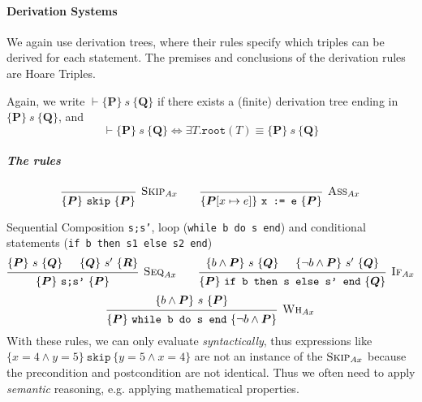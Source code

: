 \paragraph{Derivation Systems}
We again use derivation trees, where their rules specify which triples can be derived for each statement.
The premises and conclusions of the derivation rules are Hoare Triples.

Again, we write $\vdash \{ \bm{P} \} \ s \ \{ \bm{Q} \}$ if there exists a (finite) derivation tree ending in $\{ \bm{P} \} \ s \ \{ \bm{Q} \}$, and
\[
    \vdash \{ \bm{P} \} \ s \ \{ \bm{Q} \} \Leftrightarrow \exists T. \texttt{root}(T) \equiv \{ \bm{P} \} \ s \ \{ \bm{Q} \}
\]


\subparagraph{The rules}
\[
    \begin{prooftree}
        \infer0[$\textsc{Skip}_{Ax}$]{\{ \bm{P} \} \ \texttt{skip} \ \{ \bm{P} \}}
    \end{prooftree}
    \qquad
    \begin{prooftree}
        \infer0[$\textsc{Ass}_{Ax}$]{\{ \bm{P}[x \mapsto e] \} \ \texttt{x := e} \ \{ \bm{P} \}}
    \end{prooftree}
\]

Sequential Composition \texttt{s;s'}, loop (\texttt{while b do s end}) and conditional statements (\texttt{if b then s1 else s2 end})
\[
    \begin{prooftree}
        \hypo{\{ \bm{P} \} \ s \ \{ \bm{Q} \}}
        \hypo{\{ \bm{Q} \} \ s' \ \{ \bm{R} \}}
        \infer2[$\textsc{Seq}_{Ax}$]{\{ \bm{P} \} \ \texttt{s;s'} \ \{ \bm{P} \}}
    \end{prooftree}
    \qquad
    \begin{prooftree}
        \hypo{\{ b \land \bm{P} \} \ s \ \{ \bm{Q} \}}
        \hypo{\{ \neg b \land \bm{P} \} \ s' \ \{ \bm{Q} \}}
        \infer2[$\textsc{If}_{Ax}$]{\{ \bm{P} \} \ \texttt{if b then s else s' end} \ \{ \bm{Q} \}}
    \end{prooftree}
\]
\[
    \begin{prooftree}
        \hypo{\{ b \land \bm{P} \} \ s \ \{ \bm{P} \}}
        \infer1[$\textsc{Wh}_{Ax}$]{\{ \bm{P} \} \ \texttt{while b do s end} \ \{ \neg b \land \bm{P} \}}
    \end{prooftree}
\]
With these rules, we can only evaluate \textit{syntactically}, thus expressions like $\{ x = 4 \land y = 5 \} \ \texttt{skip} \ \{ y = 5 \land x = 4 \}$
are not an instance of the $\textsc{Skip}_{Ax}$ because the precondition and postcondition are not identical. Thus we often need to apply \textit{semantic} reasoning,
e.g. applying mathematical properties.

